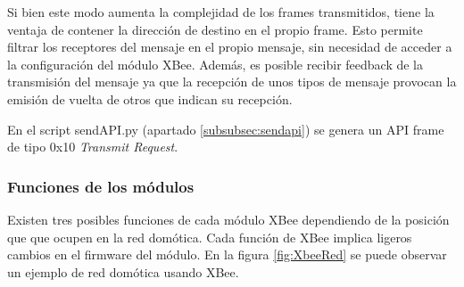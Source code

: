 \begin{itemize}
Si bien este modo aumenta la complejidad de los frames transmitidos, tiene la ventaja de contener la dirección de destino en el propio frame. Esto permite filtrar los receptores del mensaje en el propio mensaje, sin necesidad de acceder a la configuración del módulo XBee. Además, es posible recibir feedback de la transmisión del mensaje ya que la recepción de unos tipos de mensaje provocan la emisión de vuelta de otros que indican su recepción.

En el script sendAPI.py (apartado \ref{subsubsec:sendapi}) se genera un API frame de tipo 0x10 \textit{Transmit Request}.

\end{itemize}

\subsubsection{Funciones de los módulos}

Existen tres posibles funciones de cada módulo XBee dependiendo de la posición que que ocupen en la red domótica. Cada función de XBee implica ligeros cambios en el firmware del módulo. En la figura \ref{fig:XbeeRed} se puede observar un ejemplo de red domótica usando XBee.




